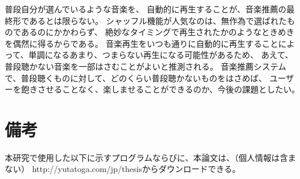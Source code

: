 \documentclass[a4paper, 11pt, onecolumn, report]{jsarticle}
\begin{document}
普段自分が選んでいるような音楽を、
自動的に再生することが、音楽推薦の最終形であるとは限らない。
シャッフル機能が人気なのは、無作為で選ばれたものであるのにかかわらず、
絶妙なタイミングで再生されたかのようなときめきを偶然に得るからである。
音楽再生をいつも通りに自動的に再生することによって、単調になるあまり、つまらない再生になる可能性があるため、
あえて、普段聴かない音楽を一部はさむことがよいと推測される。
音楽推薦システムで、普段聴くものに対して、どのくらい普段聴かないものをはさめば、
ユーザーを飽きさせることなく、楽しませることができるのか、今後の課題としたい。

\section{備考}
本研究で使用した以下に示すプログラムならびに、本論文は、（個人情報は含まない）
http://yutatoga.com/jp/thesisからダウンロードできる。
\end{document}
